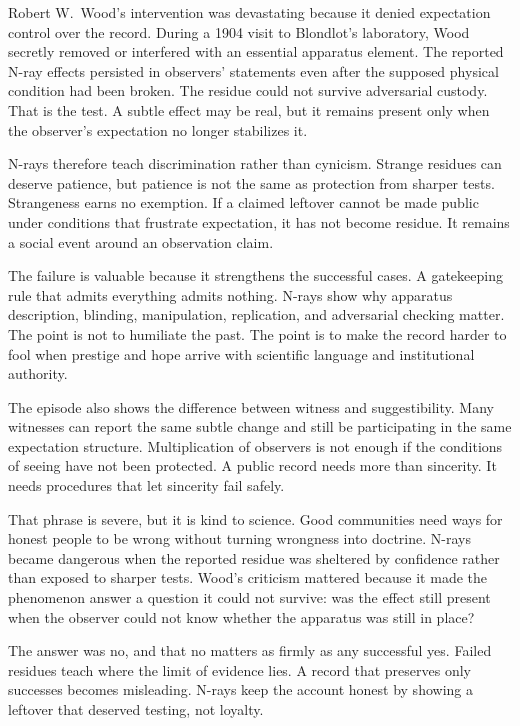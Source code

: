 Robert W.~Wood's intervention was devastating because it denied expectation
control over the record. During a 1904 visit to Blondlot's laboratory, Wood
secretly removed or interfered with an essential apparatus element. The
reported N-ray effects persisted in observers' statements even after the
supposed physical condition had been broken. The residue could not survive
adversarial custody. That is the test. A subtle effect may be real, but it
remains present only when the observer's expectation no longer stabilizes
it.

N-rays therefore teach discrimination rather than cynicism. Strange residues
can deserve patience, but patience is not the same as protection from
sharper tests. Strangeness earns no exemption. If a claimed leftover cannot
be made public under conditions that frustrate expectation, it has not
become residue. It remains a social event around an observation claim.

The failure is valuable because it strengthens the successful cases. A
gatekeeping rule that admits everything admits nothing. N-rays show why
apparatus description, blinding, manipulation, replication, and adversarial
checking matter. The point is not to humiliate the past. The point is to
make the record harder to fool when prestige and hope arrive with scientific
language and institutional authority.

The episode also shows the difference between witness and suggestibility.
Many witnesses can report the same subtle change and still be participating
in the same expectation structure. Multiplication of observers is not enough
if the conditions of seeing have not been protected. A public record needs
more than sincerity. It needs procedures that let sincerity fail safely.

That phrase is severe, but it is kind to science. Good communities need ways
for honest people to be wrong without turning wrongness into doctrine.
N-rays became dangerous when the reported residue was sheltered by
confidence rather than exposed to sharper tests. Wood's criticism mattered
because it made the phenomenon answer a question it could not survive: was
the effect still present when the observer could not know whether the
apparatus was still in place?

The answer was no, and that no matters as firmly as any successful yes.
Failed residues teach where the limit of evidence lies. A record that
preserves only successes becomes misleading. N-rays keep the account honest
by showing a leftover that deserved testing, not loyalty.

